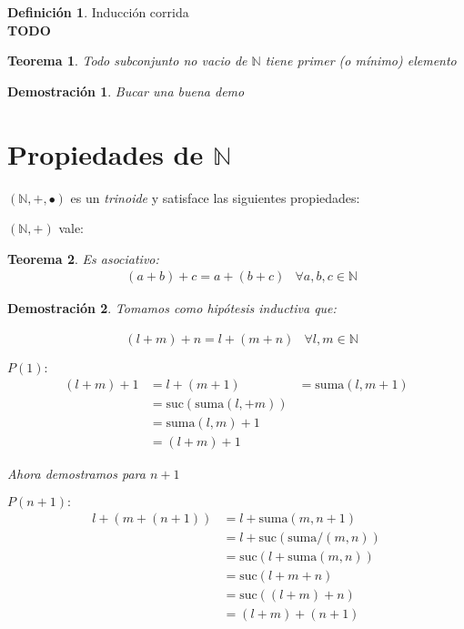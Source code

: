 \documentclass[9pt,a4paper]{article}
\theoremstyle{definition}
\newtheorem{defi}{Definición}
\theoremstyle{plain}
\newtheorem{teo}{Teorema}
\newtheorem{demo}{Demostración}[teo]
\begin{document}
\begin{defi} Inducción corrida \\ {\bfseries TODO}  \end{defi}

\begin{teo} \label{teobuenorden}Todo subconjunto no vacio de $\mathbb{N}$ tiene primer (o mínimo) elemento \end{teo}

\begin{demo}Bucar una buena demo\end{demo}

\section{Propiedades de $\mathbb{N}$}

$(\mathbb{N}, +, \bullet)$ es un {\itshape trinoide} y satisface las siguientes propiedades:

$(\mathbb{N}, +)$ vale:

\begin{teo} \label{teoasosum}Es asociativo:\\
\begin{align*} & (a+b)+c=a+(b+c) & \forall a,b,c\in{\mathbb{N}} \end{align*}
\end{teo}

\begin{demo} Tomamos como hipótesis inductiva que:

\begin{align*} & (l+m)+n=l+(m+n) & \forall l,m\in{\mathbb{N}}\end{align*}

$P(1):$
\begin{align*}
(l+m)+1 & = l+(m+1)
        & = \text{suma}(l,m+1) \\
        & = \text{suc}(\text{suma}(l,+m)) \\
        & = \text{suma}(l,m)+1 \\
        & = (l+m)+1 
\end{align*}

Ahora demostramos para $n+1$

$P(n+1):$
\begin{align*}
l+(m+(n+1)) & = l+\text{suma}(m, n+1) \\
            & = l+\text{suc}(\text{suma}/(m,n)) \\
            & = \text{suc}(l+\text{suma}(m,n)) \\
            & = \text{suc}(l+m+n) \\
            & = \text{suc}((l+m)+n) \\
            & = (l+m)+(n+1)
\end{align*}
\end{demo}
\end{document}

